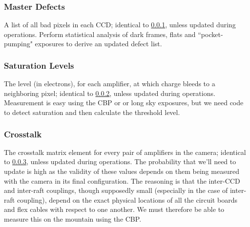 \subsubsection{Master Defects}\label{sec:CPP:output:defectList}
A list of all bad pixels in each CCD; identical to \secsymbol\ref{sec:CPP:output:defectList}, unless updated during operations.
\alg Perform statistical analysis of dark frames, flats and ``pocket-pumping" exposures to derive an updated defect list.


\subsubsection{Saturation Levels}\label{sec:CPP:output:saturationLevel}
The level (in electrons), for each amplifier, at which charge bleeds to a neighboring pixel; identical to \secsymbol\ref{sec:CPP:output:saturationLevel}, unless updated during operations.
\alg Measurement is easy using the CBP or or long sky exposures, but we need code to detect saturation and then calculate the threshold level.


\subsubsection{Crosstalk}\label{sec:CPP:output:crosstalk}
The crosstalk matrix element for every pair of amplifiers in the camera; identical to \secsymbol\ref{sec:CPP:output:crosstalk}, unless updated during operations. The probability that we'll need to update is high as the validity of these values depends on them being measured with the camera in its final configuration. The reasoning is that the inter-CCD and inter-raft couplings, though supposedly small (especially in the case of inter-raft coupling), depend on the exact physical locations of all the circuit boards and flex cables with respect to one another. We must therefore be able to measure this on the mountain using the CBP.

